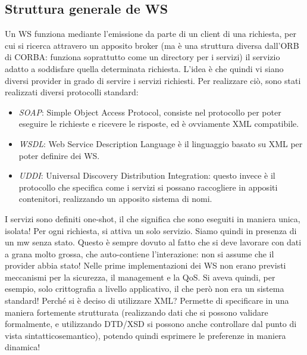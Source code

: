 \subsection{Struttura generale de WS}
Un WS funziona mediante l'emissione da parte di un client di una richiesta, per cui si ricerca attravero un apposito
broker (ma è una struttura diversa dall'ORB di CORBA: funziona soprattutto come un directory per i servizi) il
servizio adatto a soddisfare quella determinata richiesta.
L'idea è che quindi vi siano diversi provider in grado di servire i servizi richiesti. Per realizzare ciò, sono stati
realizzati diversi protocolli standard:
\begin{itemize}
 \item \textit{SOAP}: Simple Object Access Protocol, consiste nel protocollo per poter eseguire le richieste e ricevere
 le risposte, ed è ovviamente XML compatibile.
 \item \textit{WSDL}: Web Service Description Language è il linguaggio basato su XML per poter definire dei WS.
 \item \textit{UDDI}: Universal Discovery Distribution Integration: questo invece è il protocollo che specifica come i
 servizi si possano raccogliere in appositi contenitori, realizzando un apposito sistema di nomi.
\end{itemize}
I servizi sono definiti one-shot, il che significa che sono eseguiti in maniera unica, isolata! Per ogni richiesta, si
attiva un solo servizio. Siamo quindi in presenza di un mw senza stato. Questo è sempre dovuto al fatto che si deve
lavorare con dati a grana molto grossa, che auto-contiene l'interazione: non si assume che il provider abbia stato!
Nelle prime implementazioni dei WS non erano previsti meccanismi per la sicurezza, il management e la QoS. Si aveva
quindi, per esempio, solo crittografia a livello applicativo, il che però non era un sistema standard!
Perché si è deciso di utilizzare XML? Permette di specificare in una maniera fortemente strutturata (realizzando dati
che si possono validare formalmente, e utilizzando DTD/XSD si possono anche controllare dal punto di vista
sintatticosemantico), potendo quindi esprimere le preferenze in maniera dinamica!
